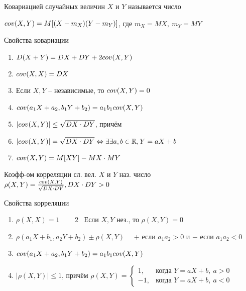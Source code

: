 
\OPR Ковариацией случайных величин
$X$ и
$Y$ называется число 

$cov(X,Y)=M[(X-m_X)(Y-m_Y)]$, где $m_X=MX,~m_Y=MY$

Свойства ковариации
\begin{enumerate}[topsep=0pt, leftmargin=20pt, noitemsep, label=\arabic*\degree]
	\item $D(X+Y)=DX+DY+2cov(X,Y)$
	
	\item $cov(X,X)=DX$
	
	\item Если $X,Y$ -- независимые, то $cov(X,Y)=0$
	
	\item $cov(a_1X+a_2,b_1Y+b_2)=a_1b_1cov(X,Y)$
	
	\item $|cov(X,Y)|\leq\sqrt{DX\cdot DY}$, причём 
	\item [] $|cov(X,Y)|=\sqrt{DX\cdot DY}\Leftrightarrow \exists\exists a,b\in\mathbb{R}, Y=aX+b$
	
	\item $cov(X,Y)=M[XY]-MX\cdot MY$
\end{enumerate}

\OPR Коэфф-ом корреляции сл. вел. $X$ и $Y$ наз. число $\rho(X,Y)=\tfrac{cov(X,Y)}{\sqrt{DX\cdot DY}},DX\cdot DY >0$

Свойства корреляции
\begin{enumerate}[topsep=0pt, leftmargin=20pt, noitemsep, label=\arabic*\degree]
	\item $\rho(X,X)=1$ ~~~ 2\degree~ Если $X,Y$ нез., то $\rho(X,Y)=0$
	
	\setcounter{enumi}{2}
	
	\item $\rho(a_1X+b_1,a_2Y+b_2)\pm\rho(X,Y)$~~ $+$ если $a_1a_2>0$ и $-$ если $a_1a_2<0$
	
	\item $cov(a_1X+a_2,b_1Y+b_2)=a_1b_1cov(X,Y)$
	
	\item $|\rho(X,Y)|\leq 1$, причём $\rho(X,Y)=
	\begin{cases}
		1, & \text{когда } Y=aX+b,~a>0\\
		-1, & \text{когда } Y=aX+b,~a<0
	\end{cases}$
\end{enumerate}

